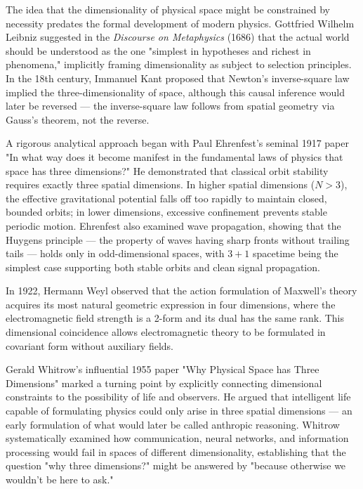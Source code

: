 \begin{historical}
    The idea that the dimensionality of physical space might be constrained by necessity predates the formal development of modern physics. Gottfried Wilhelm Leibniz suggested in the \emph{Discourse on Metaphysics} (1686) that the actual world should be understood as the one "simplest in hypotheses and richest in phenomena," implicitly framing dimensionality as subject to selection principles. In the 18th century, Immanuel Kant proposed that Newton's inverse-square law implied the three-dimensionality of space, although this causal inference would later be reversed — the inverse-square law follows from spatial geometry via Gauss's theorem, not the reverse.
    
    A rigorous analytical approach began with Paul Ehrenfest's seminal 1917 paper "In what way does it become manifest in the fundamental laws of physics that space has three dimensions?" He demonstrated that classical orbit stability requires exactly three spatial dimensions. In higher spatial dimensions ($N > 3$), the effective gravitational potential falls off too rapidly to maintain closed, bounded orbits; in lower dimensions, excessive confinement prevents stable periodic motion. Ehrenfest also examined wave propagation, showing that the Huygens principle — the property of waves having sharp fronts without trailing tails — holds only in odd-dimensional spaces, with $3+1$ spacetime being the simplest case supporting both stable orbits and clean signal propagation.
    
    In 1922, Hermann Weyl observed that the action formulation of Maxwell's theory acquires its most natural geometric expression in four dimensions, where the electromagnetic field strength is a 2-form and its dual has the same rank. This dimensional coincidence allows electromagnetic theory to be formulated in covariant form without auxiliary fields.
    
    Gerald Whitrow's influential 1955 paper "Why Physical Space has Three Dimensions" marked a turning point by explicitly connecting dimensional constraints to the possibility of life and observers. He argued that intelligent life capable of formulating physics could only arise in three spatial dimensions — an early formulation of what would later be called anthropic reasoning. Whitrow systematically examined how communication, neural networks, and information processing would fail in spaces of different dimensionality, establishing that the question "why three dimensions?" might be answered by "because otherwise we wouldn't be here to ask."
    

\end{historical}
